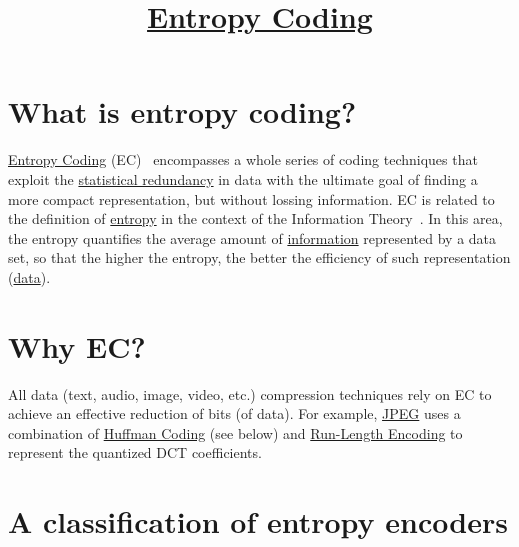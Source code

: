 



\title{\href{https://sistemas-multimedia.github.io/contents/entropy_coding/}{Entropy Coding}}

\maketitle

\tableofcontents

\section{What is entropy coding?}

\href{https://en.wikipedia.org/wiki/Entropy_coding}{Entropy Coding}
(EC)~\cite{vruiz__entropy_coding} encompasses a whole series of coding
techniques that exploit the
\href{https://en.wikipedia.org/wiki/Redundancy_(information_theory)}{statistical
  redundancy} in data with the ultimate goal of finding a more compact
representation, but without lossing information. EC is related to the definition of
\href{https://en.wikipedia.org/wiki/Entropy_(information_theory)}{entropy}
in the context of the Information
Theory~\cite{vruiz__information_theory}. In this area, the entropy
quantifies the average amount of
\href{https://en.wikipedia.org/wiki/Information}{information}
represented by a data set, so that the higher the entropy, the better
the efficiency of such representation
(\href{https://en.wikipedia.org/wiki/Data}{data}).

\section{Why EC?}
All data (text, audio, image, video, etc.) compression techniques rely
on EC to achieve an effective reduction of bits (of data). For example,
\href{https://en.wikipedia.org/wiki/JPEG}{JPEG} uses a combination of
\href{https://en.wikipedia.org/wiki/Huffman_coding}{Huffman Coding}
(see below) and
\href{https://en.wikipedia.org/wiki/Run-length_encoding}{Run-Length
  Encoding} to represent the quantized DCT coefficients.

\section{A classification of entropy encoders}

